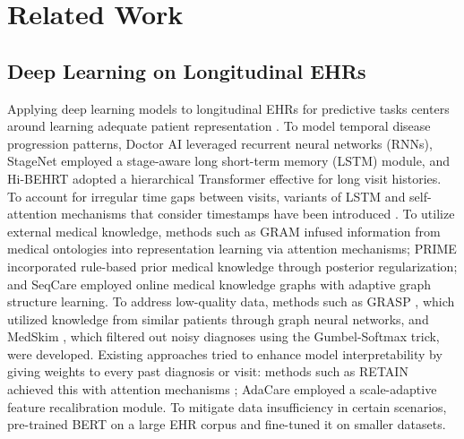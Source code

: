 \section{Related Work}
\subsection{Deep Learning on Longitudinal EHRs}
Applying deep learning models to longitudinal EHRs for predictive tasks centers around learning adequate patient representation \citep{ehr:3, baseline:16, tan2024enhancing}. To model temporal disease progression patterns, Doctor AI \citep{baseline:1} leveraged recurrent neural networks (RNNs), StageNet \citep{baseline:4} employed a stage-aware long short-term memory (LSTM) module, and Hi-BEHRT \citep{ehr:18} adopted a hierarchical Transformer effective for long visit histories. To account for irregular time gaps between visits, variants of LSTM and self-attention mechanisms that consider timestamps have been introduced \citep{baseline:9, baseline:11, ehr:20}. To utilize external medical knowledge, methods such as GRAM \citep{baseline:6, baseline:13, baseline:15, ehr:1, baseline:17} infused information from medical ontologies into representation learning via attention mechanisms; PRIME \citep{ehr:21} incorporated rule-based prior medical knowledge through posterior regularization; and SeqCare \citep{ehr:2} employed online medical knowledge graphs with adaptive graph structure learning. To address low-quality data, methods such as GRASP \citep{ehr:22}, which utilized knowledge from similar patients through graph neural networks, and MedSkim \citep{ehr:5}, which filtered out noisy diagnoses using the Gumbel-Softmax trick, were developed. Existing approaches tried to enhance model interpretability by giving weights to every past diagnosis or visit: methods such as RETAIN achieved this with attention mechanisms \citep{baseline:2, baseline:3, baseline:5, baseline:12, ehr:13, ehr:19, baseline:14, ehr:7}; AdaCare \citep{baseline:8} employed a scale-adaptive feature recalibration module. To mitigate data insufficiency in certain scenarios, \citet{ehr:6} pre-trained BERT on a large EHR corpus and fine-tuned it on smaller datasets.

